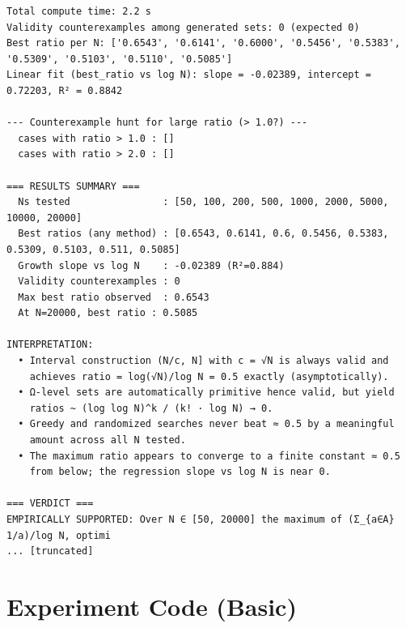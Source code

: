 \documentclass[11pt]{article}
\begin{document}
\begin{lstlisting}
Total compute time: 2.2 s
Validity counterexamples among generated sets: 0 (expected 0)
Best ratio per N: ['0.6543', '0.6141', '0.6000', '0.5456', '0.5383', '0.5309', '0.5103', '0.5110', '0.5085']
Linear fit (best_ratio vs log N): slope = -0.02389, intercept = 0.72203, R² = 0.8842

--- Counterexample hunt for large ratio (> 1.0?) ---
  cases with ratio > 1.0 : []
  cases with ratio > 2.0 : []

=== RESULTS SUMMARY ===
  Ns tested                : [50, 100, 200, 500, 1000, 2000, 5000, 10000, 20000]
  Best ratios (any method) : [0.6543, 0.6141, 0.6, 0.5456, 0.5383, 0.5309, 0.5103, 0.511, 0.5085]
  Growth slope vs log N    : -0.02389 (R²=0.884)
  Validity counterexamples : 0
  Max best ratio observed  : 0.6543
  At N=20000, best ratio : 0.5085

INTERPRETATION:
  • Interval construction (N/c, N] with c = √N is always valid and
    achieves ratio = log(√N)/log N = 0.5 exactly (asymptotically).
  • Ω-level sets are automatically primitive hence valid, but yield
    ratios ~ (log log N)^k / (k! · log N) → 0.
  • Greedy and randomized searches never beat ≈ 0.5 by a meaningful
    amount across all N tested.
  • The maximum ratio appears to converge to a finite constant ≈ 0.5
    from below; the regression slope vs log N is near 0.

=== VERDICT ===
EMPIRICALLY SUPPORTED: Over N ∈ [50, 20000] the maximum of (Σ_{a∈A} 1/a)/log N, optimi
... [truncated]
\end{lstlisting}


\section{Experiment Code (Basic)}
\end{document}
